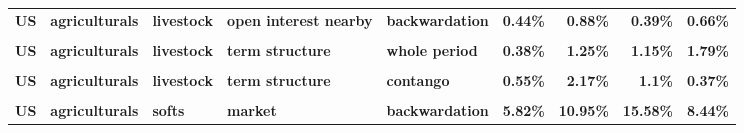\documentclass[
  authoryear,
  preprint,
  3p]{elsarticle}
\begin{document}
\begin{landscape}
\begin{longtable}[t]{>{}l>{}l>{}l>{}l>{}l>{}r>{}r>{}r>{}r}
\addlinespace
\textbf{US} & \textbf{agriculturals} & \textbf{livestock} & \textbf{open interest nearby} & \textbf{backwardation} & \textcolor[HTML]{4285f4}{\textbf{0.44\%}} & \textcolor[HTML]{4285f4}{\textbf{0.88\%}} & \textcolor[HTML]{4285f4}{\textbf{0.39\%}} & \textcolor[HTML]{4285f4}{\textbf{0.66\%}}\\
\textbf{\cellcolor{gray!10}{US}} & \textbf{\cellcolor{gray!10}{agriculturals}} & \textbf{\cellcolor{gray!10}{livestock}} & \textbf{\cellcolor{gray!10}{open interest nearby}} & \textbf{\cellcolor{gray!10}{contango}} & \textcolor[HTML]{4285f4}{\textbf{\cellcolor{gray!10}{0.5\%}}} & \textcolor[HTML]{4285f4}{\textbf{\cellcolor{gray!10}{0.3\%}}} & \textcolor[HTML]{4285f4}{\textbf{\cellcolor{gray!10}{0.19\%}}} & \textcolor[HTML]{4285f4}{\textbf{\cellcolor{gray!10}{0.28\%}}}\\
\textbf{US} & \textbf{agriculturals} & \textbf{livestock} & \textbf{term structure} & \textbf{whole period} & \textcolor[HTML]{4285f4}{\textbf{0.38\%}} & \textcolor[HTML]{4285f4}{\textbf{1.25\%}} & \textcolor[HTML]{4285f4}{\textbf{1.15\%}} & \textcolor[HTML]{4285f4}{\textbf{1.79\%}}\\
\textbf{\cellcolor{gray!10}{US}} & \textbf{\cellcolor{gray!10}{agriculturals}} & \textbf{\cellcolor{gray!10}{livestock}} & \textbf{\cellcolor{gray!10}{term structure}} & \textbf{\cellcolor{gray!10}{backwardation}} & \textcolor[HTML]{4285f4}{\textbf{\cellcolor{gray!10}{0.59\%}}} & \textcolor[HTML]{4285f4}{\textbf{\cellcolor{gray!10}{1.09\%}}} & \textcolor[HTML]{4285f4}{\textbf{\cellcolor{gray!10}{1.43\%}}} & \textcolor[HTML]{4285f4}{\textbf{\cellcolor{gray!10}{4.47\%}}}\\
\textbf{US} & \textbf{agriculturals} & \textbf{livestock} & \textbf{term structure} & \textbf{contango} & \textcolor[HTML]{4285f4}{\textbf{0.55\%}} & \textcolor[HTML]{4285f4}{\textbf{2.17\%}} & \textcolor[HTML]{4285f4}{\textbf{1.1\%}} & \textcolor[HTML]{4285f4}{\textbf{0.37\%}}\\
\addlinespace
\textbf{\cellcolor{gray!10}{US}} & \textbf{\cellcolor{gray!10}{agriculturals}} & \textbf{\cellcolor{gray!10}{softs}} & \textbf{\cellcolor{gray!10}{market}} & \textbf{\cellcolor{gray!10}{whole period}} & \textcolor[HTML]{4285f4}{\textbf{\cellcolor{gray!10}{4.78\%}}} & \textcolor[HTML]{4285f4}{\textbf{\cellcolor{gray!10}{9.9\%}}} & \textcolor[HTML]{4285f4}{\textbf{\cellcolor{gray!10}{18.39\%}}} & \textcolor[HTML]{4285f4}{\textbf{\cellcolor{gray!10}{8.48\%}}}\\
\textbf{US} & \textbf{agriculturals} & \textbf{softs} & \textbf{market} & \textbf{backwardation} & \textcolor[HTML]{4285f4}{\textbf{5.82\%}} & \textcolor[HTML]{4285f4}{\textbf{10.95\%}} & \textcolor[HTML]{4285f4}{\textbf{15.58\%}} & \textcolor[HTML]{4285f4}{\textbf{8.44\%}}\\

\end{longtable}
\end{landscape}
\end{document}
